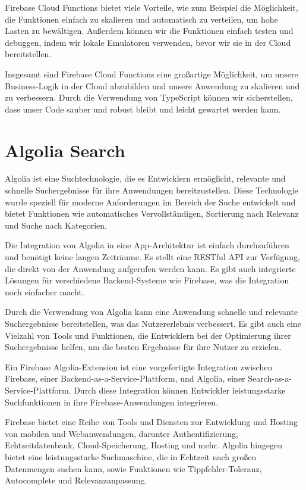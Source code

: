 Firebase Cloud Functions bietet viele Vorteile, wie zum Beispiel die Möglichkeit, die Funktionen einfach zu skalieren und automatisch zu verteilen, um hohe Lasten zu bewältigen. Außerdem können wir die Funktionen einfach testen und debuggen, indem wir lokale Emulatoren verwenden, bevor wir sie in der Cloud bereitstellen.

Insgesamt sind Firebase Cloud Functions eine großartige Möglichkeit, um unsere Business-Logik in der Cloud abzubilden und unsere Anwendung zu skalieren und zu verbessern. Durch die Verwendung von TypeScript können wir sicherstellen, dass unser Code sauber und robust bleibt und leicht gewartet werden kann.

\section{Algolia Search}
Algolia ist eine Suchtechnologie, die es Entwicklern ermöglicht, relevante und schnelle Suchergebnisse für ihre Anwendungen bereitzustellen. Diese Technologie wurde speziell für moderne Anforderungen im Bereich der Suche entwickelt und bietet Funktionen wie automatisches Vervollständigen, Sortierung nach Relevanz und Suche nach Kategorien.

Die Integration von Algolia in eine App-Architektur ist einfach durchzuführen und benötigt keine langen Zeiträume. Es stellt eine RESTful API zur Verfügung, die direkt von der Anwendung aufgerufen werden kann. Es gibt auch integrierte Lösungen für verschiedene Backend-Systeme wie Firebase, was die Integration noch einfacher macht.

Durch die Verwendung von Algolia kann eine Anwendung schnelle und relevante Suchergebnisse bereitstellen, was das Nutzererlebnis verbessert. Es gibt auch eine Vielzahl von Tools und Funktionen, die Entwicklern bei der Optimierung ihrer Suchergebnisse helfen, um die besten Ergebnisse für ihre Nutzer zu erzielen.

Ein Firebase Algolia-Extension ist eine vorgefertigte Integration zwischen Firebase, einer Backend-as-a-Service-Plattform, und Algolia, einer Search-as-a-Service-Plattform. Durch diese Integration können Entwickler leistungsstarke Suchfunktionen in ihre Firebase-Anwendungen integrieren.

Firebase bietet eine Reihe von Tools und Diensten zur Entwicklung und Hosting von mobilen und Webanwendungen, darunter Authentifizierung, Echtzeitdatenbank, Cloud-Speicherung, Hosting und mehr. Algolia hingegen bietet eine leistungsstarke Suchmaschine, die in Echtzeit nach großen Datenmengen suchen kann, sowie Funktionen wie Tippfehler-Toleranz, Autocomplete und Relevanzanpassung.

